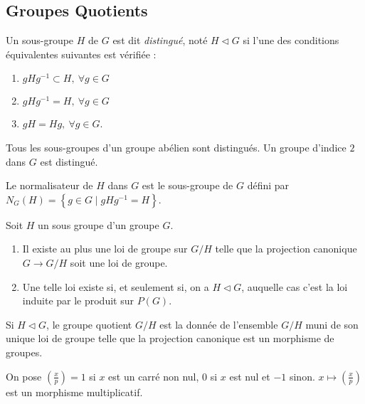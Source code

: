 \documentclass{cours}
\begin{document}
\subsection{Groupes Quotients}
\begin{definition}
    Un sous-groupe $H$ de $G$ est dit \emph{distingué}, noté $H \lhd G$ si l'une des conditions équivalentes suivantes est vérifiée :
    \begin{enumerate}
        \item $gHg^{-1} \subset H,\ \forall g \in G$
        \item $gHg^{-1} = H,\ \forall g \in G$
        \item $gH = Hg, \ \forall g \in G$.
    \end{enumerate}
\end{definition}

\begin{remark}
    Tous les sous-groupes d'un groupe abélien sont distingués. Un groupe d'indice $2$ dans $G$ est distingué.
\end{remark}
\begin{definition}
    Le normalisateur de $H$ dans $G$ est le sous-groupe de $G$ défini par $N_{G}(H) = \left\{g \in G \mid gHg^{-1} = H\right\}$.
\end{definition}

\begin{theorem}
    Soit $H$ un sous groupe d'un groupe $G$.
    \begin{enumerate}
        \item Il existe au plus une loi de groupe sur $G/H$ telle que la projection canonique $G \rightarrow G/H$ soit une loi de groupe.
        \item Une telle loi existe si, et seulement si, on a $H \lhd G$, auquelle cas c'est la loi induite par le produit sur $P(G)$.
    \end{enumerate}
\end{theorem}

\begin{definition}
    Si $H \lhd G$, le groupe quotient $G/H$ est la donnée de l'ensemble $G/H$ muni de son unique loi de groupe telle que la projection canonique est un morphisme de groupes.
\end{definition}

\begin{definition}
    On pose $\left(\frac{x}{p}\right) = 1$ si $x$ est un carré non nul, $0$ si $x$ est nul et $-1$ sinon. $x \mapsto \left(\frac{x}{p}\right)$ est un morphisme multiplicatif.
\end{definition}
\end{document}
